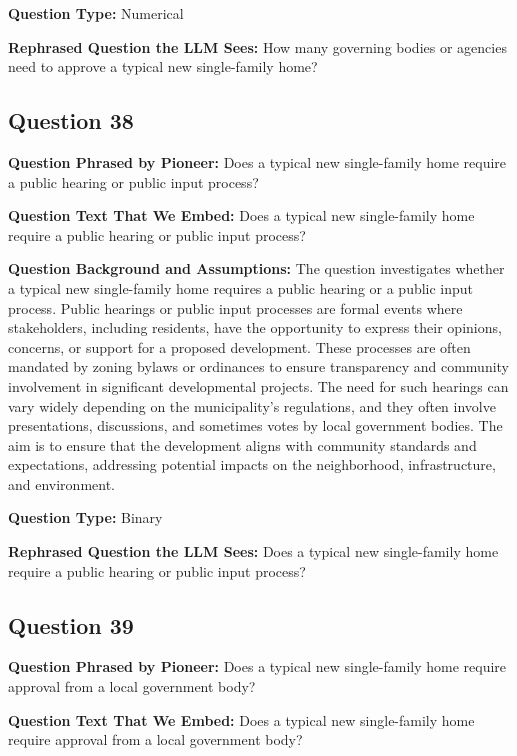 \noindent\textbf{Question Type:} Numerical

\noindent\textbf{Rephrased Question the LLM Sees:} How many governing bodies or agencies need to approve a typical new single-family home?

\vspace{1cm}
\subsection*{Question 38}
\noindent\textbf{Question Phrased by Pioneer:} Does a typical new single-family home require a public hearing or public input process?

\noindent\textbf{Question Text That We Embed:} Does a typical new single-family home require a public hearing or public input process?

\noindent\textbf{Question Background and Assumptions:} The question investigates whether a typical new single-family home requires a public hearing or a public input process. Public hearings or public input processes are formal events where stakeholders, including residents, have the opportunity to express their opinions, concerns, or support for a proposed development. These processes are often mandated by zoning bylaws or ordinances to ensure transparency and community involvement in significant developmental projects. The need for such hearings can vary widely depending on the municipality's regulations, and they often involve presentations, discussions, and sometimes votes by local government bodies. The aim is to ensure that the development aligns with community standards and expectations, addressing potential impacts on the neighborhood, infrastructure, and environment.

\noindent\textbf{Question Type:} Binary

\noindent\textbf{Rephrased Question the LLM Sees:} Does a typical new single-family home require a public hearing or public input process?

\vspace{1cm}
\subsection*{Question 39}
\noindent\textbf{Question Phrased by Pioneer:} Does a typical new single-family home require approval from a local government body?

\noindent\textbf{Question Text That We Embed:} Does a typical new single-family home require approval from a local government body?

